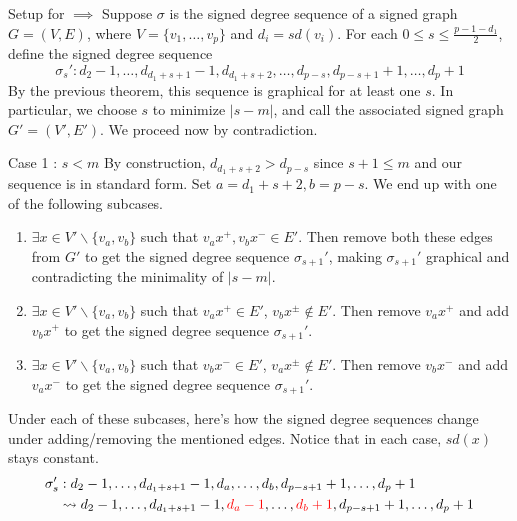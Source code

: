 \begin{frame}{Setup for $\implies$}
	Suppose $\sigma$ is the signed degree sequence of a signed graph $G = (V,E)$, where $V = \{v_1,\dots,v_p\}$ and $d_i = sd(v_i)$. For each $0 \leq s \leq \frac{p-1-d_1}{2}$, define the signed degree sequence
	\begin{equation*}
		\sigma_s' : d_2-1,\dots,d_{d_1+s+1}-1,d_{d_1+s+2},\dots,d_{p-s},d_{p-s+1}+1,\dots,d_p+1
	\end{equation*}
	By the previous theorem, this sequence is graphical for at least one $s$. In particular, we choose $s$ to minimize $|s-m|$, and call the associated signed graph $G' = (V',E')$. We proceed now by contradiction.
\end{frame}

\begin{frame}{Case 1 : $s < m$}
	By construction, $d_{d_1+s+2} > d_{p-s}$ since $s+1 \leq m$ and our sequence is in standard form. Set $a = d_1+s+2, b = p - s$. We end up with one of the following subcases.
	\begin{enumerate}
		\item $\exists x \in V'\backslash\{v_a,v_b\}$ such that $v_ax^{+}, v_bx^{-} \in E'$. Then remove both these edges from $G'$ to get the signed degree sequence $\sigma_{s+1}'$, making $\sigma_{s+1}'$ graphical and contradicting the minimality of $|s - m|$.
		\item $\exists x \in V'\backslash\{v_a,v_b\}$ such that $v_ax^{+} \in E'$, $v_bx^{\pm} \notin E'$. Then remove $v_ax^{+}$ and add $v_bx^{+}$ to get the signed degree sequence $\sigma_{s+1}'$.
		\item $\exists x \in V'\backslash\{v_a,v_b\}$ such that $v_bx^{-} \in E'$, $v_ax^{\pm} \notin E'$. Then remove $v_bx^{-}$ and add $v_ax^{-}$ to get the signed degree sequence $\sigma_{s+1}'$.
	\end{enumerate}
\end{frame}


\begin{frame}
	Under each of these subcases, here's how the signed degree sequences change under adding/removing the mentioned edges. Notice that in each case, $sd(x)$ stays constant.
	\begin{align*}
		\sigma^\prime_s&: d_2-1, \dots, d_{d_1+s+1}-1, d_{a}, \dots, d_{b}, d_{p-s+1}+1, \dots, d_p+1 \\
			& \leadsto d_2-1, \dots, d_{d_1+s+1}-1, \color{red} d_{a} - 1 \color{black}, \dots, \color{red} d_{b} + 1 \color{black}, d_{p-s+1}+1, \dots, d_p+1
	\end{align*}
\end{frame}


